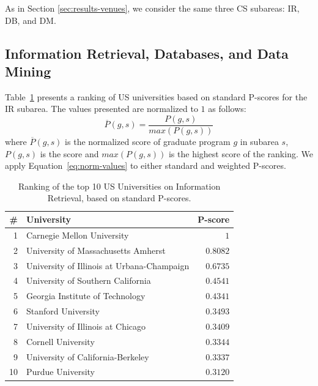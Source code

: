 \documentclass[msc]{ppgccufmg}
\begin{document}
As in Section \ref{sec:results-venues}, we consider the same three CS subareas: IR, DB, and DM.

\subsection*{Information Retrieval, Databases, and Data Mining}
Table~\ref{tab:top10-ir-pscore} presents a ranking of US universities based on standard P-scores for the IR subarea. The values presented are normalized to $1$ as follows:
\begin{equation}\label{eq:norm-values}
    \overline{P}(g,s) = \frac{P(g,s)}{max(P(g,s))}
\end{equation}
where $\overline{P}(g,s)$ is the normalized score of graduate program $g$ in subarea $s$, $P(g,s)$ is the score and $max(P(g,s))$ is the highest score of the ranking. We apply Equation~\ref{eq:norm-values} to either standard and weighted P-scores.

\begin{table}[htbp]
\centering
\caption{Ranking of the top 10 US Universities on Information Retrieval, based on standard P-scores.}
\label{tab:top10-ir-pscore}
\begin{tabular}{rlr}
    \toprule
    \# & University                                 & \multicolumn{1}{c}{P-score} \\
    \midrule
    1  & Carnegie Mellon University                 & $1$            \\
    2  & University of Massachusetts Amherst        & $0.8082$ \\
    3  & University of Illinois at Urbana-Champaign & $0.6735$ \\
    4  & University of Southern California          & $0.4541$ \\
    5  & Georgia Institute of Technology            & $0.4341$ \\
    6  & Stanford University                        & $0.3493$ \\
    7  & University of Illinois at Chicago          & $0.3409$ \\
    8  & Cornell University                         & $0.3344$ \\
    9  & University of California-Berkeley          & $0.3337$ \\
    10 & Purdue University                          & $0.3120$ \\
    \bottomrule
\end{tabular}
\end{table}
\end{document}
